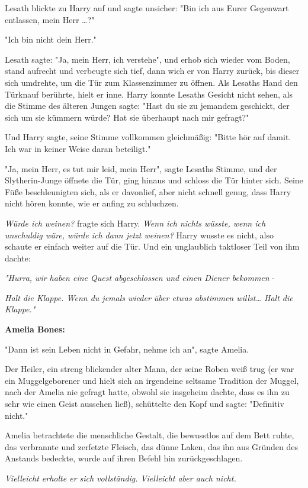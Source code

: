 {Lesath blickte zu Harry auf und sagte unsicher: "Bin ich aus Eurer Gegenwart entlassen, mein Herr …?"

"Ich bin nicht dein Herr."

Lesath sagte: "Ja, mein Herr, ich verstehe", und erhob sich wieder vom Boden, stand aufrecht und verbeugte sich tief, dann wich er von Harry zurück, bis dieser sich umdrehte, um die Tür zum Klassenzimmer zu öffnen. Als Lesaths Hand den Türknauf berührte, hielt er inne. Harry konnte Lesaths Gesicht nicht sehen, als die Stimme des älteren Jungen sagte: "Hast du sie zu jemandem geschickt, der sich um sie kümmern würde? Hat sie überhaupt nach mir gefragt?"

Und Harry sagte, seine Stimme vollkommen gleichmäßig: "Bitte hör auf damit. Ich war in keiner Weise daran beteiligt."

"Ja, mein Herr, es tut mir leid, mein Herr", sagte Lesaths Stimme, und der Slytherin-Junge öffnete die Tür, ging hinaus und schloss die Tür hinter sich. Seine Füße beschleunigten sich, als er davonlief, aber nicht schnell genug, dass Harry nicht hören konnte, wie er anfing zu schluchzen.

\emph{Würde ich weinen?} fragte sich Harry. \emph{Wenn ich nichts wüsste, wenn ich unschuldig wäre, würde ich dann jetzt weinen?} Harry wusste es nicht, also schaute er einfach weiter auf die Tür. Und ein unglaublich taktloser Teil von ihm dachte:

\emph{"Hurra, wir haben eine Quest abgeschlossen und einen Diener bekommen} -

\emph{Halt die Klappe. Wenn du jemals wieder über etwas abstimmen willst… Halt die Klappe."}

\textbf{Amelia Bones:}

"Dann ist sein Leben nicht in Gefahr, nehme ich an", sagte Amelia.

Der Heiler, ein streng blickender alter Mann, der seine Roben weiß trug (er war ein Muggelgeborener und hielt sich an irgendeine seltsame Tradition der Muggel, nach der Amelia nie gefragt hatte, obwohl sie insgeheim dachte, dass es ihn zu sehr wie einen Geist aussehen ließ), schüttelte den Kopf und sagte: "Definitiv nicht."

Amelia betrachtete die menschliche Gestalt, die bewusstlos auf dem Bett ruhte, das verbrannte und zerfetzte Fleisch, das dünne Laken, das ihn aus Gründen des Anstands bedeckte, wurde auf ihren Befehl hin zurückgeschlagen.

\emph{Vielleicht erholte er sich vollständig. Vielleicht aber auch nicht.}

}
